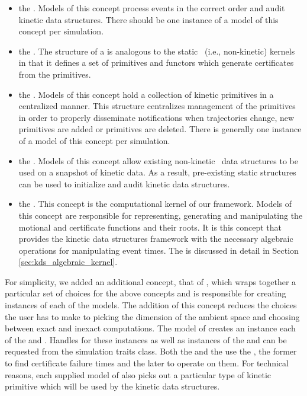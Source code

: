 \begin{itemize}

\item the . Models of this concept process events in
  the correct order and audit kinetic data structures. There should be
  one instance of a model of this concept per simulation.
\item the . The structure of a
   is analogous to the static \cgal\ (i.e.,
  non-kinetic) kernels in that it defines a set of primitives and
  functors which generate certificates from the primitives.
\item the . Models of this concept hold a
  collection of kinetic primitives in a centralized manner. This
  structure centralizes management of the primitives in order to
  properly disseminate notifications when trajectories change, new
  primitives are added or primitives are deleted.
  There is generally one instance of a model of this concept per simulation.
\item the . Models of this concept allow
  existing non-kinetic \cgal\ data structures to be used on a snapshot
  of kinetic data. As a result, pre-existing static structures can be
  used to initialize and audit kinetic data structures.
\item the . This concept is the computational
  kernel of our framework.  Models of this concept are responsible for
  representing, generating and manipulating the motional and
  certificate functions and their roots. It is this concept that
  provides the kinetic data structures framework with the necessary
  algebraic operations for manipulating event times. The
   is discussed in detail in Section
  \ref{sec:kds_algebraic_kernel}.
\end{itemize}

For simplicity, we added an additional concept, that of
, which wraps together a particular set of
choices for the above concepts and is responsible for creating
instances of each of the models. The addition of this concept reduces
the choices the user has to make to picking the dimension of the
ambient space and choosing between exact and inexact computations. The
model of  creates an instance each of the
 and . Handles for
these instances as well as instances of the 
and  can be requested from the simulation
traits class. Both the  and the
 use the , the former to find
certificate failure times and the later to operate on them. For
technical reasons, each supplied model of  also
picks out a particular type of kinetic primitive which will be used by
the kinetic data structures.


